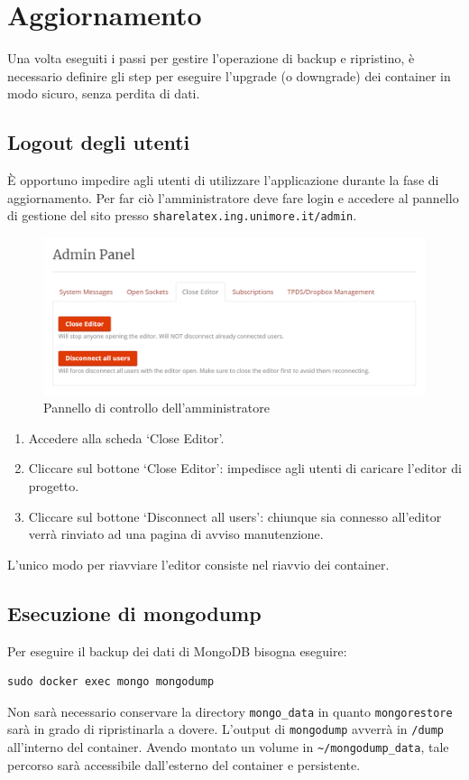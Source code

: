 \section{Aggiornamento}
Una volta eseguiti i passi per gestire l'operazione di backup e ripristino, è necessario definire gli step per eseguire l'upgrade (o downgrade) dei container in modo sicuro, senza perdita di dati.

\subsection{Logout degli utenti}
È opportuno impedire agli utenti di utilizzare l'applicazione durante la fase di aggiornamento. Per far ciò l'amministratore deve fare login e accedere al pannello di gestione del sito presso \verb|sharelatex.ing.unimore.it/admin|.
\begin{figure}[h]
    \centering
    \includegraphics[width=\textwidth]{immagini/close_editor.PNG}
    \caption{Pannello di controllo dell'amministratore}
    \label{fig:close_editor}
\end{figure}
\begin{enumerate}
    \item Accedere alla scheda \enquote*{Close Editor}.
    \item Cliccare sul bottone \enquote*{Close Editor}: impedisce agli utenti di caricare l'editor di progetto.
    \item Cliccare sul bottone \enquote*{Disconnect all users}: chiunque sia connesso all'editor verrà rinviato ad una pagina di avviso manutenzione.
\end{enumerate}
L'unico modo per riavviare l'editor consiste nel riavvio dei container.

\subsection{Esecuzione di mongodump}
Per eseguire il backup dei dati di MongoDB bisogna eseguire:
\begin{lstlisting}
sudo docker exec mongo mongodump
\end{lstlisting}
Non sarà necessario conservare la directory \verb|mongo_data| in quanto \verb|mongorestore| sarà in grado di ripristinarla a dovere. L'output di \verb|mongodump| avverrà in \verb|/dump| all'interno del container. Avendo montato un volume in \verb|~/mongodump_data|, tale percorso sarà accessibile dall'esterno del container e persistente.

